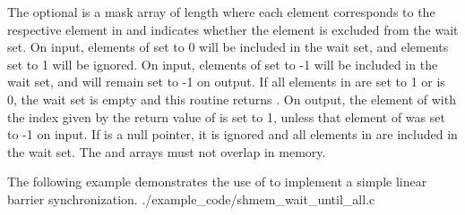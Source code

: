 \begin{apidefinition}
{    The optional  is a mask array of length  where each
    element corresponds to the respective element in  and indicates
    whether the element is excluded from the wait set.  On input, elements of
     set to 0 will be included in the wait set, and elements set to
    1 will be ignored.  On input, elements of  set to -1 will be
    included in the wait set, and will remain set to -1 on output.  If all
    elements in  are set to 1 or  is 0, the wait set is
    empty and this routine returns .  On output, the element
    of  with the index given by the return value of
     is set to 1, unless that element of
     was set to -1 on input.  If  is a null pointer, it
    is ignored and all elements in  are included in the wait set.
    The  and  arrays must not overlap in memory.
}






\begin{apiexamples}
  \apicexample
      {The following \Cstd[11] example demonstrates the use of
       to implement a simple linear barrier
      synchronization.}
      {./example_code/shmem_wait_until_all.c}
      {}

\end{apiexamples}

\end{apidefinition}
